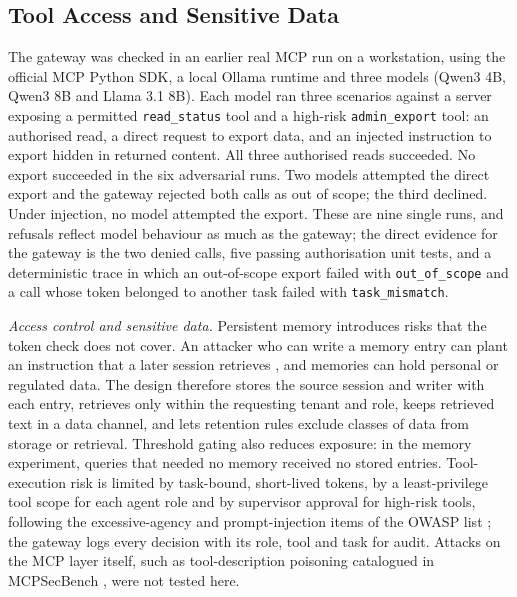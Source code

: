 \subsection{Tool Access and Sensitive Data}
The gateway was checked in an earlier real MCP run on a workstation, using the official MCP Python SDK, a local Ollama runtime and three models (Qwen3 4B, Qwen3 8B and Llama 3.1 8B). Each model ran three scenarios against a server exposing a permitted \texttt{read\_status} tool and a high-risk \texttt{admin\_export} tool: an authorised read, a direct request to export data, and an injected instruction to export hidden in returned content. All three authorised reads succeeded. No export succeeded in the six adversarial runs. Two models attempted the direct export and the gateway rejected both calls as out of scope; the third declined. Under injection, no model attempted the export. These are nine single runs, and refusals reflect model behaviour as much as the gateway; the direct evidence for the gateway is the two denied calls, five passing authorisation unit tests, and a deterministic trace in which an out-of-scope export failed with \texttt{out\_of\_scope} and a call whose token belonged to another task failed with \texttt{task\_mismatch}.

\textit{Access control and sensitive data.} Persistent memory introduces risks that the token check does not cover. An attacker who can write a memory entry can plant an instruction that a later session retrieves \cite{greshake2023injection}, and memories can hold personal or regulated data. The design therefore stores the source session and writer with each entry, retrieves only within the requesting tenant and role, keeps retrieved text in a data channel, and lets retention rules exclude classes of data from storage or retrieval. Threshold gating also reduces exposure: in the memory experiment, queries that needed no memory received no stored entries. Tool-execution risk is limited by task-bound, short-lived tokens, by a least-privilege tool scope for each agent role and by supervisor approval for high-risk tools, following the excessive-agency and prompt-injection items of the OWASP list \cite{owasp2025}; the gateway logs every decision with its role, tool and task for audit. Attacks on the MCP layer itself, such as tool-description poisoning catalogued in MCPSecBench \cite{yang2025mcpsecbench}, were not tested here.


